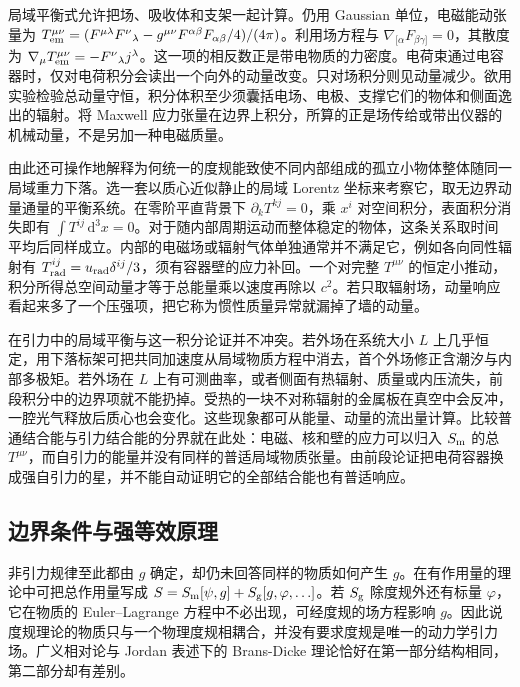局域平衡式允许把场、吸收体和支架一起计算。仍用 Gaussian 单位，电磁能动张量为 $T_{\rm em}^{\mu\nu}=(F^{\mu\lambda}F^\nu{}_{\lambda}-g^{\mu\nu}F^{\alpha\beta}F_{\alpha\beta}/4)/(4\pi)$。利用场方程与 $\nabla_{[\alpha}F_{\beta\gamma]}=0$，其散度为 $\nabla_\mu T_{\rm em}^{\mu\nu}=-F^\nu{}_{\lambda}j^\lambda$。这一项的相反数正是带电物质的力密度。电荷束通过电容器时，仅对电荷积分会读出一个向外的动量改变。只对场积分则见动量减少。欲用实验检验总动量守恒，积分体积至少须囊括电场、电极、支撑它们的物体和侧面逸出的辐射。将 Maxwell 应力张量在边界上积分，所算的正是场传给或带出仪器的机械动量，不是另加一种电磁质量。

由此还可操作地解释为何统一的度规能致使不同内部组成的孤立小物体整体随同一局域重力下落。选一套以质心近似静止的局域 Lorentz 坐标来考察它，取无边界动量通量的平衡系统。在零阶平直背景下 $\partial_k T^{kj}=0$，乘 $x^i$ 对空间积分，表面积分消失即有 $\int T^{ij}\,\mathrm d^3x=0$。对于随内部周期运动而整体稳定的物体，这条关系取时间平均后同样成立。内部的电磁场或辐射气体单独通常并不满足它，例如各向同性辐射有 $T_{\rm rad}^{ij}=u_{\rm rad}\delta^{ij}/3$，须有容器壁的应力补回。一个对完整 $T^{\mu\nu}$ 的恒定小推动，积分所得总空间动量才等于总能量乘以速度再除以 $c^2$。若只取辐射场，动量响应看起来多了一个压强项，把它称为惯性质量异常就漏掉了墙的动量。

在引力中的局域平衡与这一积分论证并不冲突。若外场在系统大小 $L$ 上几乎恒定，用下落标架可把共同加速度从局域物质方程中消去，首个外场修正含潮汐与内部多极矩。若外场在 $L$ 上有可测曲率，或者侧面有热辐射、质量或内压流失，前段积分中的边界项就不能扔掉。受热的一块不对称辐射的金属板在真空中会反冲，一腔光气释放后质心也会变化。这些现象都可从能量、动量的流出量计算。比较普通结合能与引力结合能的分界就在此处：电磁、核和壁的应力可以归入 $S_{\rm m}$ 的总 $T^{\mu\nu}$，而自引力的能量并没有同样的普适局域物质张量。由前段论证把电荷容器换成强自引力的星，并不能自动证明它的全部结合能也有普适响应。

\subsection{边界条件与强等效原理}

非引力规律至此都由 $g$ 确定，却仍未回答同样的物质如何产生 $g$。在有作用量的理论中可把总作用量写成 $S=S_{\rm m}[\psi,g]+S_{\rm g}[g,\varphi,\ldots]$。若 $S_{\rm g}$ 除度规外还有标量 $\varphi$，它在物质的 Euler--Lagrange 方程中不必出现，可经度规的场方程影响 $g$。因此说度规理论的物质只与一个物理度规相耦合，并没有要求度规是唯一的动力学引力场。广义相对论与 Jordan 表述下的 Brans-Dicke 理论恰好在第一部分结构相同，第二部分却有差别。


